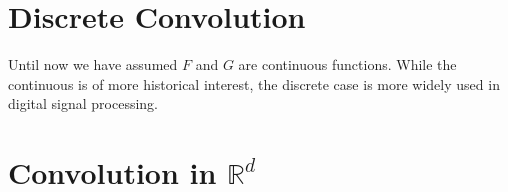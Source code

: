 %
%
\section{Discrete Convolution}

Until now we have assumed $F$ and $G$ are continuous functions. 
While the continuous is of more historical interest, the discrete case is more widely used in digital signal processing.


\section{Convolution in $\mathbb{R}^d$}

\newpage